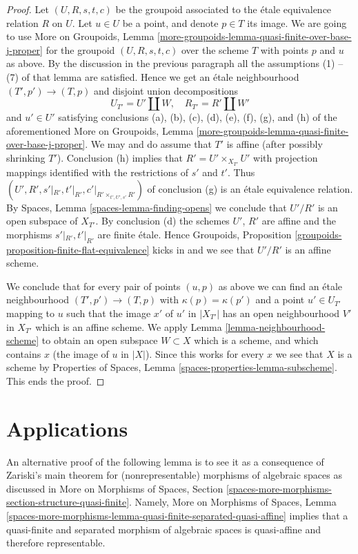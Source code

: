 \documentclass{stacks-project}
\theoremstyle{plain}
\theoremstyle{definition}
\theoremstyle{remark}
\numberwithin{equation}{subsection}
\begin{document}
\begin{proof}
\medskip\noindent
Let $(U, R, s, t, c)$ be the groupoid associated to the \'etale
equivalence relation $R$ on $U$. Let $u \in U$ be a point, and
denote $p \in T$ its image. We are going to use
More on Groupoids,
Lemma \ref{more-groupoids-lemma-quasi-finite-over-base-j-proper}
for the groupoid $(U, R, s, t, c)$ over the scheme $T$ with
points $p$ and $u$ as above.
By the discussion in the previous paragraph all the
assumptions (1) -- (7) of that lemma are satisfied.
Hence we get an \'etale neighbourhood
$(T', p') \to (T, p)$ and disjoint union decompositions
$$
U_{T'} = U' \amalg W, \quad
R_{T'} = R' \amalg W'
$$
and $u' \in U'$ satisfying conclusions
(a), (b), (c), (d), (e), (f), (g), and (h) of the aforementioned
More on Groupoids,
Lemma \ref{more-groupoids-lemma-quasi-finite-over-base-j-proper}.
We may and do assume that $T'$ is affine (after possibly shrinking $T'$).
Conclusion (h) implies that $R' = U' \times_{X_{T'}} U'$ with projection
mappings identified with the restrictions of $s'$ and $t'$.
Thus $(U', R', s'|_{R'}, t'|_{R'}, c'|_{R' \times_{t', U', s'} R'})$ of
conclusion (g) is an \'etale equivalence relation. By
Spaces, Lemma \ref{spaces-lemma-finding-opens}
we conclude that $U'/R'$ is an open subspace of $X_{T'}$. By conclusion (d)
the schemes $U'$, $R'$ are affine and the morphisms
$s'|_{R'}, t'|_{R'}$ are finite \'etale. Hence
Groupoids, Proposition \ref{groupoids-proposition-finite-flat-equivalence}
kicks in and we see that $U'/R'$ is an affine scheme.

\medskip\noindent
We conclude that for every pair of points $(u, p)$ as above we can
find an \'etale neighbourhood $(T', p') \to (T, p)$ with
$\kappa(p) = \kappa(p')$ and a point $u' \in U_{T'}$ mapping to $u$
such that the image $x'$ of $u'$ in $|X_{T'}|$ has an open neighbourhood
$V'$ in $X_{T'}$ which is an affine scheme. We apply
Lemma \ref{lemma-neighbourhood-scheme}
to obtain an open subspace $W \subset X$ which is a scheme, and
which contains $x$ (the image of $u$ in $|X|$).
Since this works for every $x$ we see that $X$
is a scheme by
Properties of Spaces, Lemma \ref{spaces-properties-lemma-subscheme}.
This ends the proof.
\end{proof}



\section{Applications}
\label{section-applications}

\noindent
An alternative proof of the following lemma is to see it as a consequence
of Zariski's main theorem for (nonrepresentable) morphisms of algebraic spaces
as discussed in More on Morphisms of Spaces, Section
\ref{spaces-more-morphisms-section-structure-quasi-finite}.
Namely, More on Morphisms of Spaces, Lemma
\ref{spaces-more-morphisms-lemma-quasi-finite-separated-quasi-affine}
implies that a quasi-finite and separated morphism of algebraic spaces
is quasi-affine and therefore representable.
\end{document}

